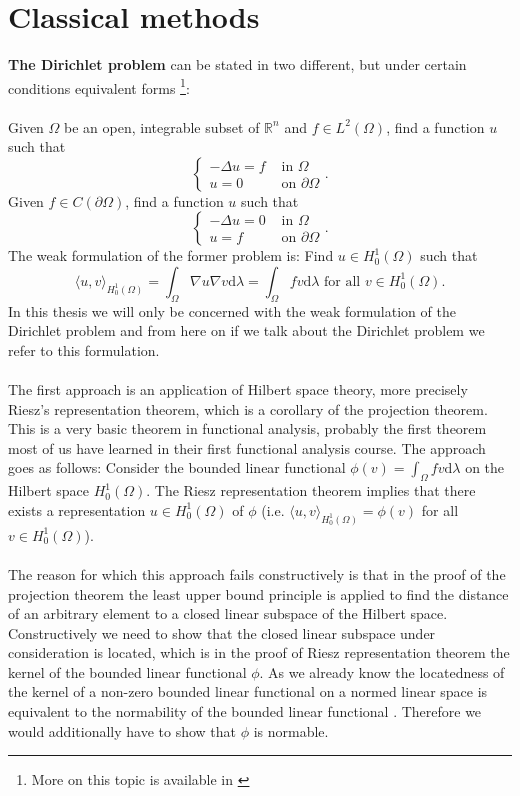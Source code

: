 \documentclass[11pt,a4paper,leqno]{report}
\numberwithin{equation}{chapter}
\begin{document}
\section{Classical methods}
\textbf{The Dirichlet problem} can be stated in two different, but under certain conditions equivalent forms \cite{Wang}\footnote{More on this topic is available in \cite{JO}}:\\
\\
Given $\Omega$ be an open, integrable subset of $\mathbb{R}^n$ and $f\in L^2(\Omega)$, find a function $u$ such that 
\begin{equation}\begin{cases}-\Delta u=f&\text{ in }\Omega\\u=0&\text{ on }\partial\Omega\end{cases}.\end{equation}
Given $f\in C(\partial\Omega)$, find a function $u$ such that 
\begin{equation}\begin{cases}-\Delta u=0&\text{ in }\Omega\\u=f&\text{ on }\partial\Omega\end{cases}.\end{equation}
The weak formulation of the former problem is: Find $u\in H^1_0(\Omega)$ such that
\begin{equation}\langle u,v\rangle_{H^1_0(\Omega)}=\int_\Omega \nabla u\nabla v\mathrm{d}\lambda=\int_\Omega fv\mathrm{d}\lambda\text{ for all }v\in H^1_0(\Omega).\end{equation}
In this thesis we will only be concerned with the weak formulation of the Dirichlet problem and from here on if we talk about the Dirichlet problem we refer to this formulation.
\\
\\
The first approach is an application of Hilbert space theory, more precisely Riesz's representation theorem, which is a corollary of the projection theorem. This is a very basic theorem in functional analysis, probably the first theorem most of us have learned in their first functional  analysis course. The approach goes as follows:
Consider the bounded linear functional $\phi(v)=\int_\Omega fv\mathrm{d}\lambda$ on the Hilbert space $H^1_0(\Omega)$. The Riesz representation theorem implies that there exists a representation $u\in H^1_0(\Omega)$ of $\phi$ (i.e. $\langle u,v\rangle_{H^1_0(\Omega)}=\phi(v)$ for all $v\in H^1_0(\Omega)$).\\
\\
The reason for which this approach fails constructively is that in the proof of the projection theorem the least upper bound principle is applied to find the distance of an arbitrary element to a closed linear subspace of the Hilbert space. Constructively we need to show that the closed linear subspace under consideration is located, which is in the proof of Riesz representation theorem the kernel of the bounded linear functional $\phi$. As we already know the locatedness of the kernel of a non-zero bounded linear functional on a normed linear space is equivalent to the normability of the bounded linear functional \cite[Proposition 5.3 p.36]{VAR}. Therefore we would additionally have to show that $\phi$ is normable.
\end{document}
